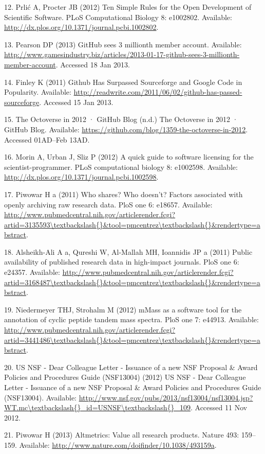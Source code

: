 \documentclass[]{article}
\begin{document}
12. Prlić A, Procter JB (2012) Ten Simple Rules for the Open Development
of Scientific Software. PLoS Computational Biology 8: e1002802.
Available: \url{http://dx.plos.org/10.1371/journal.pcbi.1002802}.

13. Pearson DP (2013) GitHub sees 3 millionth member account. Available:
\url{http://www.gamesindustry.biz/articles/2013-01-17-github-sees-3-millionth-member-account}.
Accessed 18 Jan 2013.

14. Finley K (2011) Github Has Surpassed Sourceforge and Google Code in
Popularity. Available:
\url{http://readwrite.com/2011/06/02/github-has-passed-sourceforge}.
Accessed 15 Jan 2013.

15. The Octoverse in 2012 · GitHub Blog (n.d.) The Octoverse in 2012 ·
GitHub Blog. Available:
\url{https://github.com/blog/1359-the-octoverse-in-2012}. Accessed
01AD--Feb 13AD.

16. Morin A, Urban J, Sliz P (2012) A quick guide to software licensing
for the scientist-programmer. PLoS computational biology 8: e1002598.
Available: \url{http://dx.plos.org/10.1371/journal.pcbi.1002598}.

17. Piwowar H a (2011) Who shares? Who doesn't? Factors associated with
openly archiving raw research data. PloS one 6: e18657. Available:
\url{http://www.pubmedcentral.nih.gov/articlerender.fcgi?artid=3135593\textbackslash{}\&tool=pmcentrez\textbackslash{}\&rendertype=abstract}.

18. Alsheikh-Ali A a, Qureshi W, Al-Mallah MH, Ioannidis JP a (2011)
Public availability of published research data in high-impact journals.
PloS one 6: e24357. Available:
\url{http://www.pubmedcentral.nih.gov/articlerender.fcgi?artid=3168487\textbackslash{}\&tool=pmcentrez\textbackslash{}\&rendertype=abstract}.

19. Niedermeyer THJ, Strohalm M (2012) mMass as a software tool for the
annotation of cyclic peptide tandem mass spectra. PloS one 7: e44913.
Available:
\url{http://www.pubmedcentral.nih.gov/articlerender.fcgi?artid=3441486\textbackslash{}\&tool=pmcentrez\textbackslash{}\&rendertype=abstract}.

20. US NSF - Dear Colleague Letter - Issuance of a new NSF Proposal \&
Award Policies and Procedures Guide (NSF13004) (2012) US NSF - Dear
Colleague Letter - Issuance of a new NSF Proposal \& Award Policies and
Procedures Guide (NSF13004). Available:
\url{http://www.nsf.gov/pubs/2013/nsf13004/nsf13004.jsp?WT.mc\textbackslash{}_id=USNSF\textbackslash{}_109}.
Accessed 11 Nov 2012.

21. Piwowar H (2013) Altmetrics: Value all research products. Nature
493: 159--159. Available:
\url{http://www.nature.com/doifinder/10.1038/493159a}.
\end{document}
